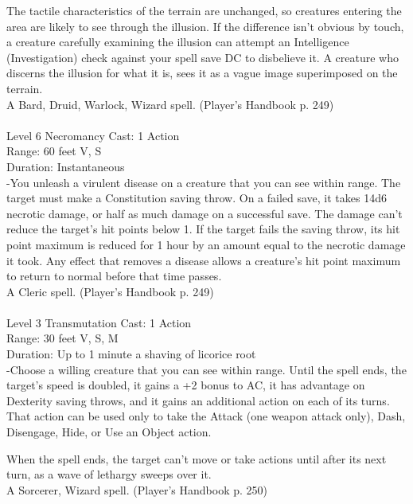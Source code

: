 \documentclass[10pt,twocolumn]{report}
\begin{document}
The tactile characteristics of the terrain are unchanged, so creatures entering the area are likely to see through the illusion. If the difference isn’t obvious by touch, a creature carefully examining the illusion can attempt an Intelligence (Investigation) check against your spell save DC to disbelieve it. A creature who discerns the illusion for what it is, sees it as a vague image superimposed on the terrain.\\
A Bard, Druid, Warlock, Wizard spell. (Player's Handbook p. 249) \\


 \\
Level 6 \quad Necromancy \quad Cast: 1 Action\\
Range: 60 feet \quad V, S\\
Duration: Instantaneous \quad \\
-You unleash a virulent disease on a creature that you can see within range.
The target must make a Constitution saving throw. On a failed save, it takes 14d6 necrotic damage, or half as much damage on a successful save. The damage can’t reduce the target’s hit points below 1. If the target fails the saving throw, its hit point maximum is reduced for 1 hour by an amount equal to the necrotic damage it took. Any effect that removes a disease allows a creature’s hit point maximum to return to normal before that time passes.\\
A Cleric spell. (Player's Handbook p. 249) \\


 \\
Level 3 \quad Transmutation \quad Cast: 1 Action\\
Range: 30 feet \quad V, S, M\\
Duration: Up to 1 minute \quad a shaving of licorice root\\
-Choose a willing creature that you can see within range. Until the spell ends, the target’s speed is doubled, it gains a +2 bonus to AC, it has advantage on Dexterity saving throws, and it gains an additional action on each of its turns. That action can be used only to take the Attack (one weapon attack only), Dash, Disengage, Hide, or Use an Object action.

When the spell ends, the target can’t move or take actions until after its next turn, as a wave of lethargy sweeps over it.\\
A Sorcerer, Wizard spell. (Player's Handbook p. 250) \\
\end{document}
